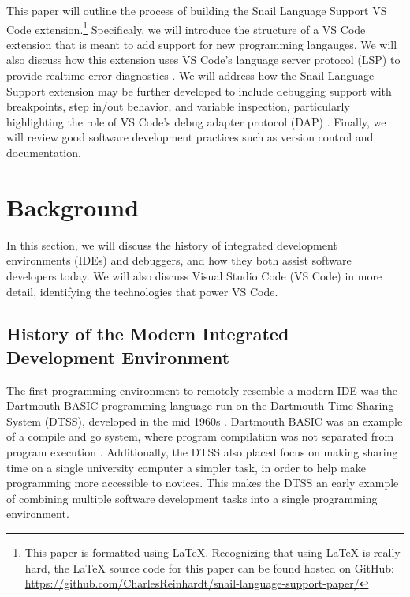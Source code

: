\documentclass{article}
\begin{document}
This paper will outline the process of building the Snail Language Support VS Code extension.\footnote{This paper is formatted using \LaTeX. Recognizing that using \LaTeX \hspace{1pt} is really hard, the \LaTeX \hspace{1pt} source code for this paper can be found hosted on GitHub: \url{https://github.com/CharlesReinhardt/snail-language-support-paper/}} Specificaly, we will introduce the structure of a VS Code extension that is meant to add support for new programming langauges. We will also discuss how this extension uses VS Code's language server protocol (LSP) to provide realtime error diagnostics \cite{Microsoft_2022a}. We will address how the Snail Language Support extension may be further developed to include debugging support with breakpoints, step in/out behavior, and variable inspection, particularly highlighting the role of VS Code's debug adapter protocol (DAP) \cite{Microsoft_2021a}. Finally, we will review good software development practices such as version control and documentation. 

\section{Background}

In this section, we will discuss the history of integrated development environments (IDEs) and debuggers, and how they both assist software developers today. We will also discuss Visual Studio Code (VS Code) in more detail, identifying the technologies that power VS Code. 

\subsection{History of the Modern Integrated Development Environment}

The first programming environment to remotely resemble a modern IDE was the Dartmouth BASIC programming language run on the Dartmouth Time Sharing System (DTSS), developed in the mid 1960s \cite{KemenyKurtz_1968, Kurtz_1978}. Dartmouth BASIC was an example of a compile and go system, where program compilation was not separated from program execution \cite{Weik_2001}. Additionally, the DTSS also placed focus on making sharing time on a single university computer a simpler task, in order to help make programming more accessible to novices. This makes the DTSS an early example of combining multiple software development tasks into a single programming environment.
\end{document}
